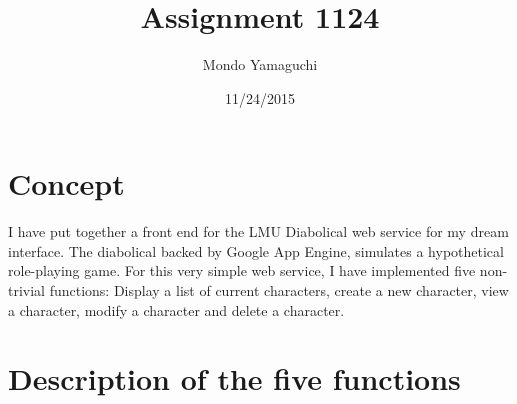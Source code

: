 \documentclass[100pt]{article}
\title{\Large{Assignment 1124}}
\author{\Large{Mondo Yamaguchi}}
\date{\Large{11/24/2015}}
\begin{document}
\maketitle


\section{\Large{Concept}}
\large{
I have put together a front end for the LMU Diabolical web service for my dream interface. The diabolical backed by Google App Engine, simulates a hypothetical role-playing game. For this very simple web service, I have implemented five non-trivial functions: Display a list of current characters, create a new character, view a character, modify a character and delete a character. 
}

\section{\Large{Description of the five functions}}
\end{document}

